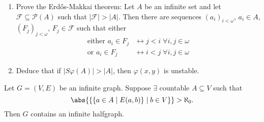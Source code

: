 \documentclass{article}
\begin{document}
\begin{ex}\leavevmode
  \begin{enumerate}[label=(\roman*)]
    \item Prove the Erd\H{o}s-Makkai theorem:
      Let $A$ be an infinite set and let $\mathcal{F} \subseteq \mathcal{P}(A)$ such that $|\mathcal{F}| > |A|$. Then there are sequences $(a_i)_{i < \omega}$, $a_i \in A$, $(F_j)_{j < \omega}$, $F_j \in \mathcal{F}$ such that either
      \begin{align*}
        \text{either }a_i \in F_j &\leftrightarrow j < i \; \forall i,j \in \omega \\
        \text{or }a_i \in F_j &\leftrightarrow i < j \; \forall i,j \in \omega
      \end{align*}
    \item Deduce that if $|S\varphi(A)| > |A|$, then $\varphi(x,y)$ is unstable.
  \end{enumerate}
\end{ex}
\begin{thm}
  Let $G = (V,E)$ be an infinite graph. Suppose $\exists$ countable $A \subseteq V$ such that
  \begin{equation*}
    \abs{\{\{a \in A \mid E(a,b)\} \mid b \in V\}} > \aleph_0.
  \end{equation*}
  Then $G$ contains an infinite halfgraph.
\end{thm}
\end{document}
